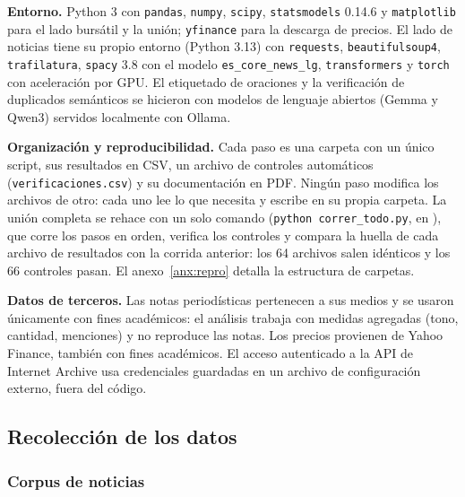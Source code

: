 \textbf{Entorno.} Python 3 con \texttt{pandas}, \texttt{numpy}, \texttt{scipy},
\texttt{statsmodels} 0.14.6 y \texttt{matplotlib} para el lado bursátil y la unión;
\texttt{yfinance} para la descarga de precios. El lado de noticias tiene su propio entorno
(Python 3.13) con \texttt{requests}, \texttt{beautifulsoup4}, \texttt{trafilatura},
\texttt{spacy} 3.8 con el modelo \texttt{es\_core\_news\_lg}, \texttt{transformers} y
\texttt{torch} con aceleración por GPU. El etiquetado de oraciones y la verificación de
duplicados semánticos se hicieron con modelos de lenguaje abiertos (Gemma y Qwen3) servidos
localmente con Ollama.

\textbf{Organización y reproducibilidad.} Cada paso es una carpeta con un único script, sus
resultados en CSV, un archivo de controles automáticos (\texttt{verificaciones.csv}) y su
documentación en PDF. Ningún paso modifica los archivos de otro: cada uno lee lo que necesita y
escribe en su propia carpeta. La unión completa se rehace con un solo comando
(\texttt{python correr\_todo.py}, en ), que corre los pasos
en orden, verifica los controles y compara la huella de cada archivo de resultados con la
corrida anterior: los 64 archivos salen idénticos y los 66 controles pasan. El anexo~\ref{anx:repro}
detalla la estructura de carpetas.

\textbf{Datos de terceros.} Las notas periodísticas pertenecen a sus medios y se usaron
únicamente con fines académicos: el análisis trabaja con medidas agregadas (tono, cantidad,
menciones) y no reproduce las notas. Los precios provienen de Yahoo Finance, también con fines
académicos. El acceso autenticado a la API de Internet Archive usa credenciales guardadas en un
archivo de configuración externo, fuera del código.

\subsection{Recolección de los datos}
\label{sec:recoleccion}

\subsubsection{Corpus de noticias}

